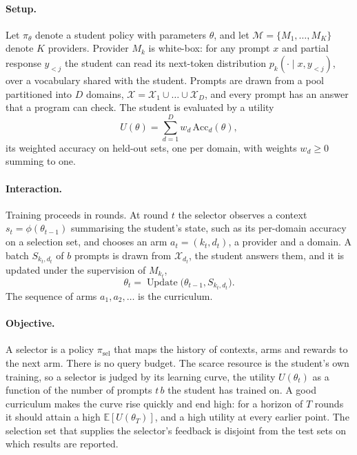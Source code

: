 \paragraph{Setup.} Let $\pi_\theta$ denote a student policy with parameters $\theta$,
and let $\mathcal{M} = \{M_1, \dots, M_K\}$ denote $K$ providers. Provider $M_k$ is
white-box: for any prompt $x$ and partial response $y_{<j}$ the student can read its
next-token distribution $p_k(\cdot \mid x, y_{<j})$, over a vocabulary shared with the
student. Prompts are drawn from a pool partitioned into $D$ domains,
$\mathcal{X} = \mathcal{X}_1 \cup \dots \cup \mathcal{X}_D$, and every prompt has an
answer that a program can check. The student is evaluated by a utility
\[
  U(\theta) = \sum_{d=1}^{D} w_d \, \mathrm{Acc}_d(\theta),
\]
its weighted accuracy on held-out sets, one per domain, with weights $w_d \ge 0$
summing to one.

\paragraph{Interaction.} Training proceeds in rounds. At round $t$ the selector
observes a context $s_t = \phi(\theta_{t-1})$ summarising the student's state, such as
its per-domain accuracy on a selection set, and chooses an arm $a_t = (k_t, d_t)$, a
provider and a domain. A batch $S_{k_t,d_t}$ of $b$ prompts is drawn from
$\mathcal{X}_{d_t}$, the student answers them, and it is updated under the supervision
of $M_{k_t}$,
\[
  \theta_t = \operatorname{Update}\!\big(\theta_{t-1}, S_{k_t,d_t}\big).
\]
The sequence of arms $a_1, a_2, \dots$ is the curriculum.

\paragraph{Objective.} A selector is a policy $\pi_{\mathrm{sel}}$ that maps the
history of contexts, arms and rewards to the next arm. There is no query budget. The
scarce resource is the student's own training, so a selector is judged by its learning
curve, the utility $U(\theta_t)$ as a function of the number of prompts $t\,b$ the
student has trained on. A good curriculum makes the curve rise quickly and end high:
for a horizon of $T$ rounds it should attain a high $\mathbb{E}[U(\theta_T)]$, and a
high utility at every earlier point. The selection set that supplies the selector's
feedback is disjoint from the test sets on which results are reported.

